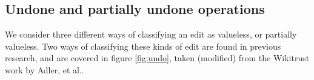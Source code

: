 
\subsection*{Undone and partially undone operations}
We consider three different ways of classifying an edit as valueless,
or partially valueless. Two ways of classifying these kinds of edit
are found in previous research, and are covered in figure
\ref{fig:undo}, taken (modified) from the Wikitrust
work by Adler, et al.\cite{Adler2007}.

